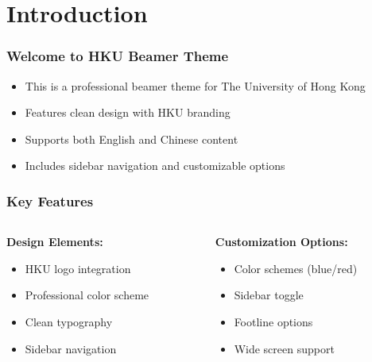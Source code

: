 \section{Introduction}

\begin{frame}
	\frametitle{Welcome to HKU Beamer Theme}
	\begin{itemize}
		\item This is a professional beamer theme for The University of Hong Kong
		\item Features clean design with HKU branding
		\item Supports both English and Chinese content
		\item Includes sidebar navigation and customizable options
	\end{itemize}
\end{frame}

\begin{frame}
	\frametitle{Key Features}
	\begin{columns}
		\begin{column}{0.5\textwidth}
			\textbf{Design Elements:}
			\begin{itemize}
				\item HKU logo integration
				\item Professional color scheme
				\item Clean typography
				\item Sidebar navigation
			\end{itemize}
		\end{column}
		\begin{column}{0.5\textwidth}
			\textbf{Customization Options:}
			\begin{itemize}
				\item Color schemes (blue/red)
				\item Sidebar toggle
				\item Footline options
				\item Wide screen support
			\end{itemize}
		\end{column}
	\end{columns}
\end{frame} 